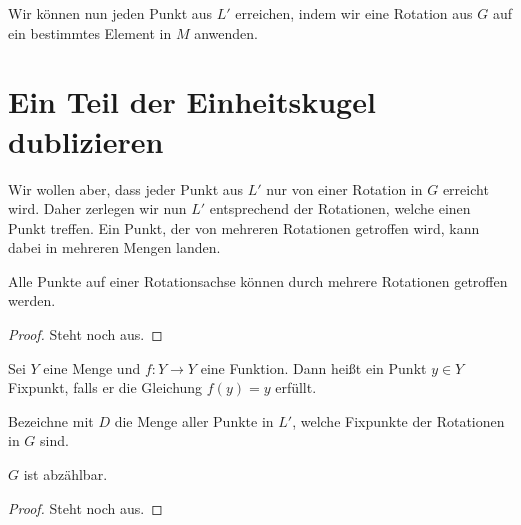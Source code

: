 Wir können nun jeden Punkt aus $L'$ erreichen, indem wir eine Rotation aus $G$ auf ein bestimmtes Element in $M$ anwenden.

\section{Ein Teil der Einheitskugel dublizieren}

Wir wollen aber, dass jeder Punkt aus $L'$ nur von einer Rotation in $G$ erreicht wird. Daher zerlegen wir nun $L'$ entsprechend
der Rotationen, welche einen Punkt treffen. Ein Punkt, der von mehreren Rotationen getroffen wird, kann dabei in mehreren Mengen landen.

\begin{lemma} \label{lemma:punkte_auf_rot_achse}
Alle Punkte auf einer Rotationsachse können durch mehrere Rotationen getroffen werden.
\end{lemma}
\begin{proof}
Steht noch aus.
\end{proof}

\begin{definition}[Fixpunkte] \label{def:fixpunkte}
Sei $Y$ eine Menge und $f:Y\rightarrow Y$ eine Funktion. Dann heißt ein Punkt $y\in Y$ Fixpunkt, falls er die Gleichung $f(y)=y$
erfüllt.
\end{definition}

\begin{definition} \label{def:menge_fixpunkte} 
Bezeichne mit $D$ die Menge aller Punkte in $L'$, welche Fixpunkte der Rotationen in $G$ sind.
\end{definition}

\begin{lemma} \label{lemma:G_abzaehlbar}
$G$ ist abzählbar.
\end{lemma}
\begin{proof} 
Steht noch aus.
\end{proof}

